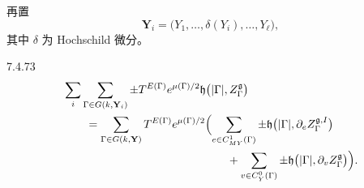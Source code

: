 再置
\[
\mathbf Y_i
=\bigl(
Y_1,\ldots,\delta(Y_i),\ldots,Y_\ell
\bigr),
\]
其中 $\delta$ 为 Hochschild 微分。

\begin{lemma}{7.4.73}\label{lem:7-4-73}
\[
\begin{aligned}
&\sum_i
\sum_{\Gamma\in G(k,\mathbf Y_i)}
\pm T^{E(\Gamma)}e^{\mu(\Gamma)/2}
\mathfrak h\bigl(
|\Gamma|,Z_\Gamma^{\mathfrak g}
\bigr)\\
&\qquad=
\sum_{\Gamma\in G(k,\mathbf Y)}
T^{E(\Gamma)}e^{\mu(\Gamma)/2}
\Bigl(
\sum_{e\in C_{MY}^1(\Gamma)}
\pm\mathfrak h\bigl(
|\Gamma|,
\partial_e Z_\Gamma^{\mathfrak g,I}
\bigr)\\
&\hspace{51mm}
+
\sum_{v\in C_Y^0(\Gamma)}
\pm\mathfrak h\bigl(
|\Gamma|,
\partial_v Z_\Gamma^{\mathfrak g}
\bigr)
\Bigr).
\end{aligned}
\]
\end{lemma}
